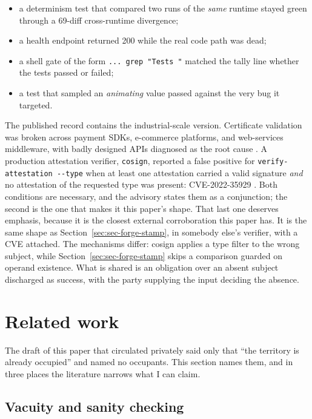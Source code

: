 \documentclass[11pt]{article}
\begin{document}
\begin{itemize}
\item a determinism test that compared two runs of the \emph{same} runtime stayed green
through a 69-diff cross-runtime divergence;
\item a health endpoint returned 200 while the real code path was dead;
\item a shell gate of the form \texttt{... \textbar{} grep "Tests "} matched the tally line whether
the tests passed or failed;
\item a test that sampled an \emph{animating} value passed against the very bug it targeted.
\end{itemize}

The published record contains the industrial-scale version. Certificate validation was
broken across payment SDKs, e-commerce platforms, and web-services middleware, with badly
designed APIs diagnosed as the root cause \citep{georgiev2012dangerous}. A production
attestation verifier, \texttt{cosign}, reported a false positive for
\texttt{verify-attestation -{}-type} when at least one attestation carried a valid
signature \emph{and} no attestation of the requested type was present: CVE-2022-35929
\citep{cve2022sigstore}. Both conditions are necessary, and the advisory states them as a
conjunction; the second is the one that makes it this paper's shape. That last one deserves
emphasis, because it is the closest external corroboration this paper has. It is the same
shape as Section~\ref{sec:sec-forge-stamp}, in somebody else's verifier, with a CVE
attached. The mechanisms differ: cosign applies a type filter to the wrong subject, while
Section~\ref{sec:sec-forge-stamp} skips a comparison guarded on operand existence. What is
shared is an obligation over an absent subject discharged as success, with the party
supplying the input deciding the absence.

\section{Related work}
\label{sec:related}

The draft of this paper that circulated privately said only that ``the territory is already
occupied'' and named no occupants. This section names them, and in three places the
literature narrows what I can claim.

\subsection{Vacuity and sanity checking}
\end{document}
